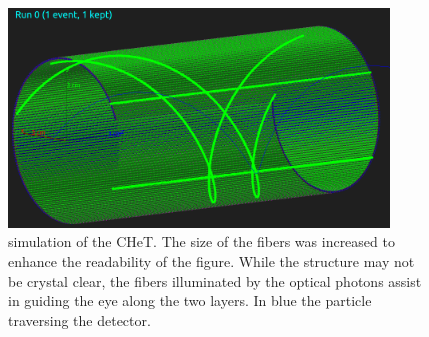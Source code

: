 \begin{refsection}
        \begin{figure}
            \centering
            \includegraphics[width = 0.9\textwidth]{Figures/muEDM/CyFi/CHeT_G4.png}
            \caption[CHeT \gf: simulated event with two hits]{\gf simulation of the CHeT. The size of the fibers was increased to enhance the readability of the figure. While the structure may not be crystal clear, the fibers illuminated by the optical photons assist in guiding the eye along the two layers. In blue the particle traversing the detector.}
            \label{fig:CHeT:G4}
        \end{figure}
        

\end{refsection}
